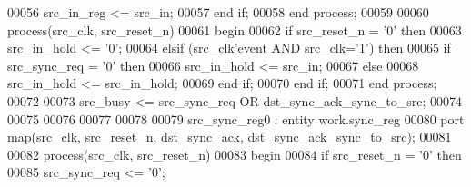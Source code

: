 \begin{DoxyCode}
00056    \textcolor{vhdlchar}{src_in_reg} \textcolor{vhdlchar}{<=} \textcolor{vhdlchar}{src_in};
00057 \textcolor{keywordflow}{end} \textcolor{keywordflow}{if};
00058 \textcolor{keywordflow}{end} \textcolor{keywordflow}{process};
00059 
00060 \textcolor{keywordflow}{process}(src_clk, src_reset_n)
00061 \textcolor{vhdlkeyword}{begin}
00062    \textcolor{keywordflow}{if} \textcolor{vhdlchar}{src_reset_n} \textcolor{vhdlchar}{=} \textcolor{vhdlchar}{'}\textcolor{vhdllogic}{}\textcolor{vhdllogic}{0}\textcolor{vhdlchar}{'} \textcolor{keywordflow}{then} 
00063       \textcolor{vhdlchar}{src_in_hold} \textcolor{vhdlchar}{<=} \textcolor{vhdlchar}{'}\textcolor{vhdllogic}{}\textcolor{vhdllogic}{0}\textcolor{vhdlchar}{'};
00064    \textcolor{keywordflow}{elsif} \textcolor{vhdlchar}{(}\textcolor{vhdlchar}{src_clk}\textcolor{vhdlchar}{'}\textcolor{vhdlkeyword}{event} \textcolor{keywordflow}{AND} \textcolor{vhdlchar}{src_clk}\textcolor{vhdlchar}{=}\textcolor{vhdlchar}{'}\textcolor{vhdllogic}{}\textcolor{vhdllogic}{1}\textcolor{vhdlchar}{'}\textcolor{vhdlchar}{)} \textcolor{keywordflow}{then} 
00065       \textcolor{keywordflow}{if} \textcolor{vhdlchar}{src_sync_req} \textcolor{vhdlchar}{=} \textcolor{vhdlchar}{'}\textcolor{vhdllogic}{}\textcolor{vhdllogic}{0}\textcolor{vhdlchar}{'} \textcolor{keywordflow}{then} 
00066          \textcolor{vhdlchar}{src_in_hold} \textcolor{vhdlchar}{<=} \textcolor{vhdlchar}{src_in};
00067       \textcolor{keywordflow}{else}
00068          \textcolor{vhdlchar}{src_in_hold} \textcolor{vhdlchar}{<=} \textcolor{vhdlchar}{src_in_hold};
00069       \textcolor{keywordflow}{end} \textcolor{keywordflow}{if};
00070    \textcolor{keywordflow}{end} \textcolor{keywordflow}{if};
00071 \textcolor{keywordflow}{end} \textcolor{keywordflow}{process};
00072 
00073 \textcolor{vhdlchar}{src_busy} \textcolor{vhdlchar}{<=} \textcolor{vhdlchar}{src_sync_req} \textcolor{keywordflow}{OR} \textcolor{vhdlchar}{dst_sync_ack_sync_to_src};
00074 
00075 
00076 
00077 
00078 
00079 src\_sync\_reg0 : \textcolor{keywordflow}{entity} work.sync_reg 
00080 \textcolor{keywordflow}{port} \textcolor{keywordflow}{map}(src_clk, src_reset_n, dst_sync_ack, dst_sync_ack_sync_to_src\textcolor{vhdlchar}{)};
00081 
00082 \textcolor{keywordflow}{process}(src_clk, src_reset_n)
00083 \textcolor{vhdlkeyword}{begin}
00084    \textcolor{keywordflow}{if} \textcolor{vhdlchar}{src_reset_n} \textcolor{vhdlchar}{=} \textcolor{vhdlchar}{'}\textcolor{vhdllogic}{}\textcolor{vhdllogic}{0}\textcolor{vhdlchar}{'} \textcolor{keywordflow}{then} 
00085       \textcolor{vhdlchar}{src_sync_req} \textcolor{vhdlchar}{<=} \textcolor{vhdlchar}{'}\textcolor{vhdllogic}{}\textcolor{vhdllogic}{0}\textcolor{vhdlchar}{'};

\end{DoxyCode}
